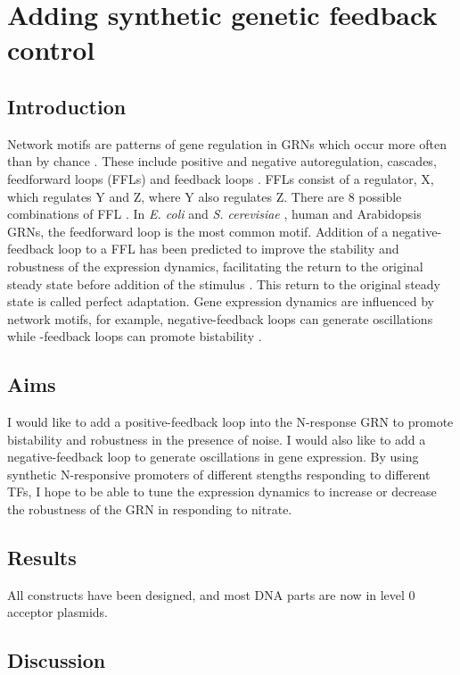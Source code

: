 \documentclass[../main.tex]{subfiles}
\begin{document}
\chapter{Adding synthetic genetic feedback control}\label{chapter6}
\section{Introduction}\label{chapter6:introduction}
Network motifs are patterns of gene regulation in GRNs which occur more often than by chance \autocite{miloNetworkMotifsSimple2002}.
These include positive and negative autoregulation, cascades, feedforward loops (FFLs) and feedback loops \autocite{shovalSnapShotNetworkMotifs2010}.
FFLs consist of a regulator, X, which regulates Y and Z, where Y also regulates Z.
There are 8 possible combinations of FFL \autocite{shovalSnapShotNetworkMotifs2010}.
In \textit{E. coli} \autocite{shen-orrNetworkMotifsTranscriptional2002} and \textit{S. cerevisiae} \autocite{leeTranscriptionalRegulatoryNetworks2002}, human \autocite{boyerCoreTranscriptionalRegulatory2005} and Arabidopsis \autocite{chenArchitectureGeneRegulatory2018} GRNs, the feedforward loop is the most common motif.
Addition of a negative-feedback loop to a FFL has been predicted to improve the stability and robustness of the expression dynamics, facilitating the return to the original steady state before addition of the stimulus \autocite{reevesEngineeringPrinciplesCombining2019}.
This return to the original steady state is called perfect adaptation.
Gene expression dynamics are influenced by network motifs, for example, negative\hyp{}feedback loops can generate oscillations while \hyp{}feedback loops can promote bistability \autocite{shovalSnapShotNetworkMotifs2010}.
\section{Aims}\label{chapter6:aims}
I would like to add a positive\hyp{}feedback loop into the N-response GRN to promote bistability and robustness in the presence of noise. I would also like to add a negative\hyp{}feedback loop to generate oscillations in gene expression.
By using synthetic N-responsive promoters of different stengths responding to different TFs, I hope to be able to tune the expression dynamics to increase or decrease the robustness of the GRN in responding to nitrate.
\section{Results}\label{chapter6:results}
All constructs have been designed, and most DNA parts are now in level 0 acceptor plasmids.
\section{Discussion}\label{chapter6:discussion}
\end{document}
